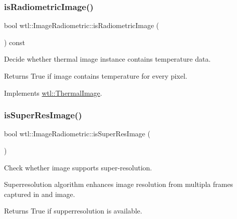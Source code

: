 \subsubsection{\texorpdfstring{is\+Radiometric\+Image()}{isRadiometricImage()}}
{\footnotesize\ttfamily bool wtl\+::\+Image\+Radiometric\+::is\+Radiometric\+Image (\begin{DoxyParamCaption}{ }\end{DoxyParamCaption}) const\hspace{0.3cm}{\ttfamily [virtual]}}



Decide whether thermal image instance contains temperature data. 

\begin{DoxyReturn}{Returns}
True if image contains temperature for every pixel. 
\end{DoxyReturn}


Implements \hyperlink{classwtl_1_1_thermal_image_a6414e809f033c1813ac6801afcfb84b5}{wtl\+::\+Thermal\+Image}.

\mbox{\label{classwtl_1_1_image_radiometric_af8fdfed71f7374c52c1e6d9a50b0fa77}} 
\subsubsection{\texorpdfstring{is\+Super\+Res\+Image()}{isSuperResImage()}}
{\footnotesize\ttfamily bool wtl\+::\+Image\+Radiometric\+::is\+Super\+Res\+Image (\begin{DoxyParamCaption}{ }\end{DoxyParamCaption})}



Check whether image supports super-\/resolution. 

Superresolution algorithm enhances image resolution from multipla frames captured in and image. \begin{DoxyReturn}{Returns}
True if supperresolution is available. 
\end{DoxyReturn}
\mbox{\label{classwtl_1_1_image_radiometric_aec1dfb43a074a912824fbf875e849040}} 
